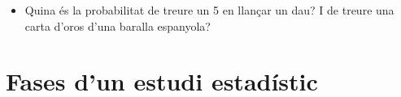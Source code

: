 \begin{iniaval}
\begin{itemize}
\begin{minipage}{0.5\textwidth}
\begin{center}
\begin{tikzpicture}
		\end{tikzpicture}
	\end{center}
\end{minipage}
  

\item Quina és la probabilitat de treure un 5 en llançar un dau? I de treure una carta d'oros d'una baralla espanyola?

\vspace{1cm}
\end{itemize}


 \end{iniaval}
\newpage

\section{Fases d'un estudi estadístic}

